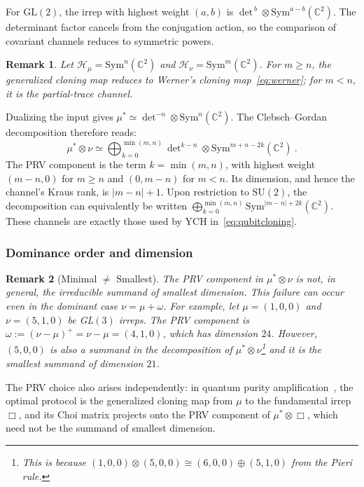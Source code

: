 \documentclass[a4paper,onecolumn,11pt]{quantumarticle}
\newtheorem{rem}{Remark}
\def\h{\mathcal{H}}
\begin{document}
For $\mathrm{GL}(2)$, the irrep with highest weight $(a,b)$ is
$\det\nolimits^{\,b}\otimes\mathrm{Sym}^{a-b}(\mathbb C^2)$.
The determinant factor cancels from the conjugation action, so the
comparison of covariant channels reduces to symmetric powers.
\begin{rem}
    Let $\h_\mu=\mathrm{Sym}^n(\mathbb{C}^2)$ and $\h_\nu= \mathrm{Sym}^m(\mathbb{C}^2)$. For $m\ge n$, the generalized cloning map reduces to Werner's cloning map~\eqref{eq:werner}; for $m<n$, it is the partial-trace channel.
\end{rem}
Dualizing the input gives
$\mu^*\simeq\det\nolimits^{-n}\otimes\mathrm{Sym}^n(\mathbb C^2)$.
The Clebsch--Gordan decomposition therefore reads:
\begin{equation}
    \mu^*\otimes\nu \simeq
    \bigoplus_{k=0}^{\min(m,n)}
    \det\nolimits^{k-n}\otimes\mathrm{Sym}^{m+n-2k}(\mathbb C^2)\ .
\end{equation}
The PRV component is the term $k=\min(m,n)$, with highest weight
$(m-n,0)$ for $m\ge n$ and $(0,m-n)$ for $m<n$.
Its dimension, and hence the channel's Kraus rank, is $|m-n|+1$.
Upon restriction to $\mathrm{SU}(2)$, the decomposition can equivalently
be written $\bigoplus_{k=0}^{\min(m,n)}\mathrm{Sym}^{|m-n|+2k}(\mathbb C^2)$.
These channels are exactly those used by YCH in~\eqref{eq:qubitcloning}.

\subsubsection{Dominance order and dimension}
\begin{rem}[Minimal $\neq$ Smallest]\label{rem:prv_not_dim_min}
The PRV component in \(\mu^*\otimes \nu\) is not, in general, the irreducible summand of smallest dimension. This failure can occur even in the dominant case $\nu=\mu+\omega$. For example, let $\mu=(1,0,0)$ and $\nu=(5,1,0)$ be GL\((3)\) irreps. The PRV component is $\omega:=(\nu-\mu)^+ = \nu-\mu=(4,1,0)$, which has dimension $24$. However, $(5,0,0)$ is also a summand in the decomposition of $\mu^*\otimes \nu$\footnote{This is because $(1,0,0)\otimes (5,0,0)\cong(6,0,0)\oplus (5,1,0)$ from the Pieri rule.} and it is the smallest summand of dimension $21$.
\end{rem}


The PRV choice also arises independently: in quantum purity amplification~\cite{keyl2001rate,li2025purity}, the optimal protocol is the generalized cloning map from $\mu$ to the fundamental irrep $\Box$, and its Choi matrix projects onto the PRV component of $\mu^*\otimes\Box$, which need not be the summand of smallest dimension.
\end{document}

